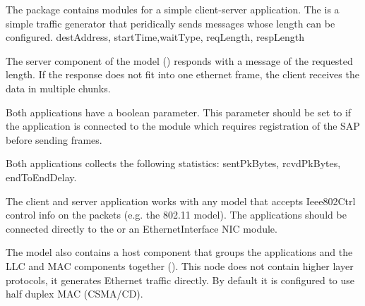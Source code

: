 The  package contains modules
for a simple client-server application. The  is a simple
traffic generator that peridically sends  messages
whose length can be configured. destAddress, startTime,waitType, reqLength, respLength

The server component of the model () responds with a
 message of the requested length. If the response does
not fit into one ethernet frame, the client receives the data in multiple
chunks.


Both applications have a  boolean parameter.
This parameter should be set to  if the application is connected
to the  module which requires registration of the SAP
before sending frames.

Both applications collects the following statistics: sentPkBytes, rcvdPkBytes,
endToEndDelay.

The client and server application works with any model that accepts
Ieee802Ctrl control info on the packets (e.g. the 802.11 model).
The applications should be connected directly to the 
or an EthernetInterface NIC module.

The model also contains a host component that groups the applications
and the LLC and MAC components together (). This node does
not contain higher layer protocols, it generates Ethernet traffic directly.
By default it is configured to use half duplex MAC (CSMA/CD).




